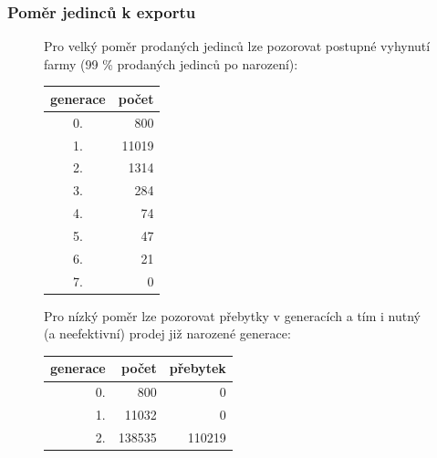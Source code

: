\documentclass[11pt, a4paper, titlepage]{article}
\begin{document}
    \subsubsection{Poměr jedinců k exportu}
    \begin{figure}[H]
        \centering
        \begin{minipage}{.48\textwidth}
            Pro velký poměr prodaných jedinců lze pozorovat postupné vyhynutí farmy (99 \% prodaných jedinců po narození):
            \begin{center}
                \begin{table}[H]
                    \begin{tabular}{|c|r|}
                        \hline
                        generace & počet \\
                        \hline
                        0. & 800  \\
                        1. & 11019  \\
                        2. & 1314  \\
                        3. & 284  \\
                        4. & 74  \\
                        5. & 47  \\
                        6. & 21  \\
                        7. & 0  \\
                        \hline
                    \end{tabular}
                \end{table}
            \end{center}
        \end{minipage}%
        \begin{minipage}{.5\textwidth}
            Pro nízký poměr lze pozorovat přebytky v generacích a tím i nutný (a neefektivní) prodej již narozené generace:
            \begin{center}
                \begin{table}[H]
                    \begin{tabular}{|r|r|r|}
                        \hline
                        generace & počet & přebytek \\
                        \hline
                        0. & 800 & 0 \\
                        1. & 11032 & 0 \\
                        2. & 138535 & 110219 \\

\end{tabular}
\end{table}
\end{center}
\end{minipage}
\end{figure}
\end{document}
